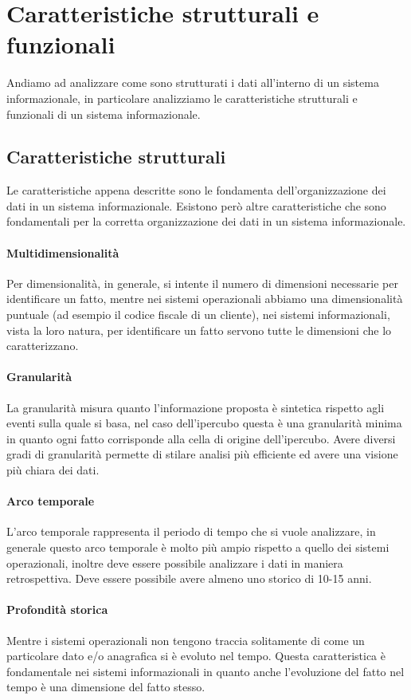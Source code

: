 \section{Caratteristiche strutturali e funzionali}
    Andiamo ad analizzare come sono strutturati i dati all'interno di un sistema informazionale, in particolare analizziamo le caratteristiche strutturali e funzionali di un sistema informazionale.
    \subsection{Caratteristiche strutturali}
        Le caratteristiche appena descritte sono le fondamenta dell'organizzazione dei dati in un sistema informazionale. Esistono però altre caratteristiche che sono fondamentali per la corretta organizzazione dei dati in un sistema informazionale.
        \paragraph{Multidimensionalità} Per dimensionalità, in generale, si intente il numero di dimensioni necessarie per identificare un fatto, mentre nei sistemi operazionali abbiamo una dimensionalità puntuale (ad esempio il codice fiscale di un cliente), nei sistemi informazionali, vista la loro natura, per identificare un fatto servono tutte le dimensioni che lo caratterizzano.
        \paragraph{Granularità} La granularità misura quanto l'informazione proposta è sintetica rispetto agli eventi sulla quale si basa, nel caso dell'ipercubo questa è una granularità minima in quanto ogni fatto corrisponde alla cella di origine dell'ipercubo. Avere diversi gradi di granularità permette di stilare analisi più efficiente ed avere una visione più chiara dei dati.
        \paragraph{Arco temporale} L'arco temporale rappresenta il periodo di tempo che si vuole analizzare, in generale questo arco temporale è molto più ampio rispetto a quello dei sistemi operazionali, inoltre deve essere possibile analizzare i dati in maniera retrospettiva. Deve essere possibile avere almeno uno storico di 10-15 anni.
        \paragraph{Profondità storica} Mentre i sistemi operazionali non tengono traccia solitamente di come un particolare dato e/o anagrafica si è evoluto nel tempo. Questa caratteristica è fondamentale nei sistemi informazionali in quanto anche l'evoluzione del fatto nel tempo è una dimensione del fatto stesso.
